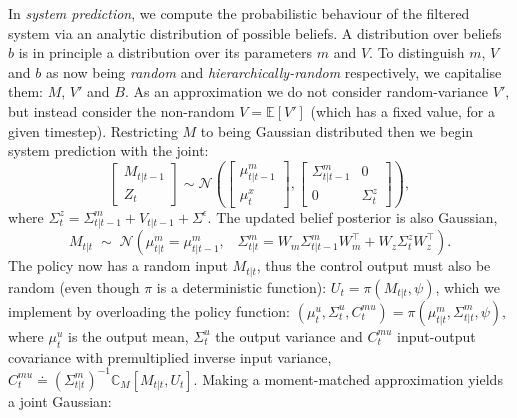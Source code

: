 \documentclass{article}
\newcommand{\N}{\mathcal{N}}
\newcommand{\C}{{\mathbb C}}
\newcommand{\E}{{\mathbb E}}
\newcommand{\pno}[1]{#1_{t|t-1}}   %
\newcommand{\uno}[1]{#1_{t|t}}     %
\newcommand{\now}[1]{#1_t}
\newcommand{\bm}{m} %
\newcommand{\BM}{M} %
\newcommand{\policyparams}{\psi} %
\begin{document}
In \emph{system prediction},
we compute the probabilistic behaviour of the
filtered system via an analytic distribution of possible beliefs.
A distribution over beliefs $b$ is in principle a distribution over
its parameters $\bm$ and $V$.
To distinguish $\bm$, $V$ and $b$ as now being
\textit{random} and \textit{hierarchically-random}
respectively,
we capitalise them: $\BM$, $V'$ and $B$. %
As an approximation we do not consider random-variance $V'$,
but instead consider the non-random $V=\E[V']$ (which has a fixed value, for a given timestep).
Restricting $\BM$ to being Gaussian distributed then
we begin system prediction with the joint:
\begin{equation}
\left[\begin{array}{c}\pno{\BM}\\\now{Z}\end{array}\right]
\sim\N\left(\left[\begin{array}{c}\pno{\mu}^\bm \\ \now{\mu}^x\end{array}\right],
\left[\begin{array}{cc}\pno{\Sigma}^\bm&0\\0&\now{\Sigma}^z\end{array}\right]\right),
\end{equation}
where $\now{\Sigma}^z=\pno{\Sigma}^m+\pno{V}+\Sigma^\epsilon$.
%
The updated belief posterior is also Gaussian,
\begin{equation}
\uno{\BM}\;\sim\;\N\left(\uno{\mu}^\bm = \pno{\mu}^\bm,\;\;\;\uno{\Sigma}^\bm = W_m\pno{\Sigma}^mW_m^\top + W_z\now{\Sigma}^zW_z^\top\right).
\end{equation}
The policy now has a random input $\uno{\BM}$, thus
the control output must also be random
(even though $\pi$ is a deterministic function):
$\now{U}=\pi(\uno{\BM},\policyparams)$,
which we implement by overloading the policy function:
$(\now{\mu}^u,\now{\Sigma}^u,\now{C}^{\bm u})
=\pi(\uno{\mu}^\bm,\uno{\Sigma}^\bm,\policyparams),$
where $\now{\mu}^u$ is the output mean, $\now{\Sigma}^u$ the output variance and
$\now{C}^{\bm u}$ input-output covariance with premultiplied
inverse input variance, $\now{C}^{\bm u} \doteq (\uno{\Sigma}^\bm)^{-1}\C_{\BM}[\uno{\BM},\now{U}]$. %
Making a moment-matched approximation yields a joint Gaussian:
\end{document}
